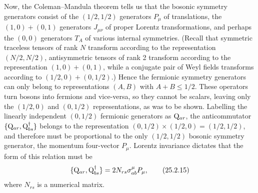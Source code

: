 Now, the Coleman--Mandula theorem tells us that the bosonic symmetry
generators consist of the \((1/2,1/2)\) generators \(P_\mu\) of
translations, the \((1,0)+(0,1)\) generators \(J_{\mu\nu}\) of proper
Lorentz transformations, and perhaps the \((0,0)\) generators \(T_A\) of
various internal symmetries. (Recall that symmetric traceless tensors of rank
\(N\) transform according to the representation \((N/2,N/2)\),
antisymmetric tensors of rank 2 transform according to the representation
\((1,0)+(0,1)\), while a conjugate pair of Weyl fields transforms according
to \((1/2,0)+(0,1/2)\).) Hence the fermionic symmetry generators
can only belong to representations \((A,B)\) with \(A+B\leq1/2\). These
operators turn bosons into fermions and vice-versa, so they cannot be
scalars, leaving only the \((1/2,0)\) and \((0,1/2)\) representations, as
was to be shown. Labelling the linearly independent \((0,1/2)\) fermionic
generators as \(\mathrm{Q}_{ar}\), the anticommutator
\(\{\mathrm{Q}_{ar},\mathrm{Q}_{bs}^\dagger\}\) belongs to the representation
\((0,1/2)\times(1/2,0)=(1/2,1/2)\), and therefore must be proportional to
the only \((1/2,1/2)\) bosonic symmetry generator, the momentum four-vector
\(P_\mu\). Lorentz invariance dictates that the form of this relation must
be
\begin{equation}
\{\mathrm{Q}_{ar},\mathrm{Q}_{bs}^\dagger\}
=2N_{rs}\sigma^\mu_{ab}P_\mu,
\tag{25.2.15}\label{eq:25.2.15}
\end{equation}
where \(N_{rs}\) is a numerical matrix.

